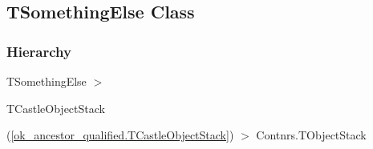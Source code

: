 \documentclass{report}
\begin{document}
\subsection*{TSomethingElse Class}
\subsubsection*{\large{\textbf{Hierarchy}}\normalsize\hspace{1ex}\hfill}
TSomethingElse {$>$} \begin{ttfamily}TCastleObjectStack\end{ttfamily}(\ref{ok_ancestor_qualified.TCastleObjectStack}) {$>$} 
Contnrs.TObjectStack
\end{document}

